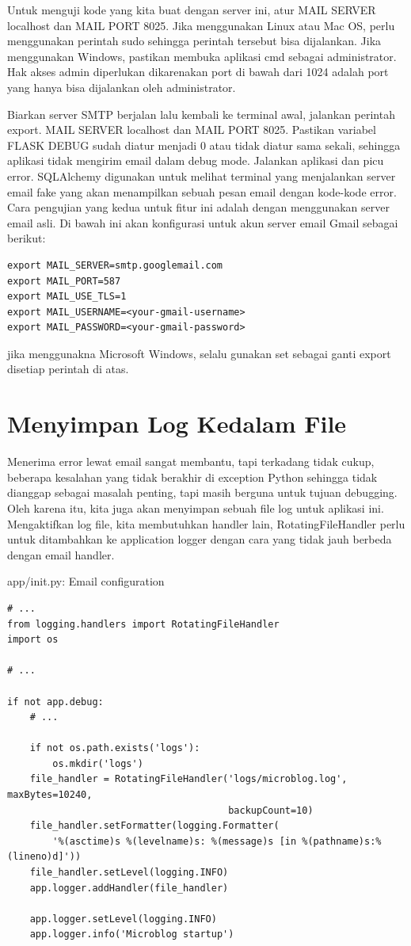 Untuk menguji kode yang kita buat dengan server ini, atur MAIL SERVER localhost dan MAIL PORT 8025. Jika menggunakan Linux atau Mac OS, perlu menggunakan perintah sudo sehingga perintah tersebut bisa dijalankan. Jika menggunakan Windows, pastikan membuka aplikasi cmd sebagai administrator. Hak akses admin diperlukan dikarenakan port di bawah dari 1024 adalah port yang hanya bisa dijalankan oleh administrator. 

Biarkan server SMTP berjalan lalu kembali ke terminal awal, jalankan perintah export. MAIL SERVER localhost dan MAIL PORT 8025. Pastikan variabel FLASK DEBUG sudah diatur menjadi 0 atau tidak diatur sama sekali, sehingga aplikasi tidak mengirim email dalam debug mode. Jalankan aplikasi dan picu error. SQLAlchemy digunakan untuk melihat terminal yang menjalankan server email fake  yang akan menampilkan sebuah pesan email dengan kode-kode error.
                                                                                                                                          Cara pengujian yang kedua untuk fitur ini adalah dengan menggunakan server email asli. Di bawah ini akan konfigurasi untuk akun server email Gmail sebagai berikut:
\begin{verbatim}
export MAIL_SERVER=smtp.googlemail.com
export MAIL_PORT=587
export MAIL_USE_TLS=1
export MAIL_USERNAME=<your-gmail-username>
export MAIL_PASSWORD=<your-gmail-password>
\end{verbatim}

jika menggunakna Microsoft Windows, selalu gunakan set sebagai ganti export disetiap perintah di atas.

\section{Menyimpan Log Kedalam File}
Menerima error lewat email sangat membantu, tapi terkadang tidak cukup, beberapa kesalahan yang tidak berakhir di exception Python sehingga tidak dianggap sebagai masalah penting, tapi masih berguna untuk tujuan debugging. Oleh karena itu, kita juga akan menyimpan sebuah file log untuk aplikasi ini. Mengaktifkan log file, kita membutuhkan handler lain, RotatingFileHandler perlu untuk ditambahkan ke application logger dengan cara yang tidak jauh berbeda dengan email handler.

app/init.py: Email configuration

\begin{verbatim}
# ...
from logging.handlers import RotatingFileHandler
import os

# ...

if not app.debug:
    # ...

    if not os.path.exists('logs'):
        os.mkdir('logs')
    file_handler = RotatingFileHandler('logs/microblog.log', maxBytes=10240,
                                       backupCount=10)
    file_handler.setFormatter(logging.Formatter(
        '%(asctime)s %(levelname)s: %(message)s [in %(pathname)s:%(lineno)d]'))
    file_handler.setLevel(logging.INFO)
    app.logger.addHandler(file_handler)

    app.logger.setLevel(logging.INFO)
    app.logger.info('Microblog startup')
\end{verbatim}

